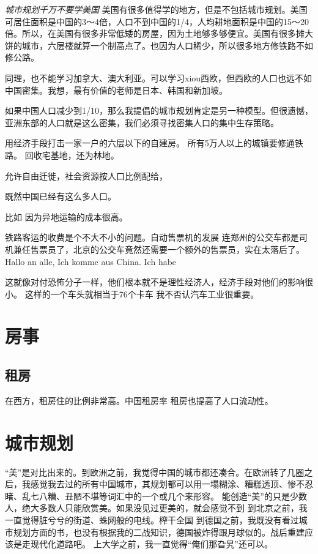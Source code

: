 \emph{城市规划千万不要学美国}
美国有很多值得学的地方，但是不包括城市规划。美国可居住面积是中国的3～4倍，人口不到中国的1/4，人均耕地面积是中国的15～20倍。所以，在美国有很多非常低矮的房屋，因为土地够多够便宜。美国有很多摊大饼的城市，六层楼就算一个制高点了。也因为人口稀少，所以很多地方修铁路不如修公路。

同理，也不能学习加拿大、澳大利亚。可以学习xiou西欧，但西欧的人口也远不如中国密集。我想，最有价值的老师是日本、韩国和新加坡。

如果中国人口减少到1/10，那么我提倡的城市规划肯定是另一种模型。但很遗憾，亚洲东部的人口就是这么密集，我们必须寻找密集人口的集中生存策略。

用经济手段打击一家一户的六层以下的自建房。
所有5万人以上的城镇要修通铁路。
回收宅基地，还为林地。

允许自由迁徙，社会资源按人口比例配给，


既然中国已经有这么多人口。


比如
因为异地运输的成本很高。

铁路客运的收费是个不大不小的问题。自动售票机的发展
连郑州的公交车都是司机兼任售票员了，北京的公交车竟然还需要一个额外的售票员，实在太落后了。
Hallo an alle,
Ich komme aus China. Ich habe

这就像对付恐怖分子一样，他们根本就不是理性经济人，经济手段对他们的影响很小。
这样的一个车头就相当于76个卡车
我不否认汽车工业很重要。

\section{房事}
\subsection{租房}
在西方，租房住的比例非常高。中国租房率
租房也提高了人口流动性。

\section{城市规划}
“美”是对比出来的。到欧洲之前，我觉得中国的城市都还凑合。在欧洲转了几圈之后，我感觉我去过的所有中国城市，其规划都可以用一塌糊涂、糟糕透顶、惨不忍睹、乱七八糟、丑陋不堪等词汇中的一个或几个来形容。
能创造“美”的只是少数人，绝大多数人只能欣赏美。如果没见过更美的，就会感觉不到
到北京之前，我一直觉得脏兮兮的街道、蛛网般的电线。榨干全国
到德国之前，我既没有看过城市规划方面的书，也没有根据我的二战知识，德国被炸得跟月球似的。战后重建应该是走现代化道路吧。
上大学之前，我一直觉得“俺们那旮旯”还可以。

